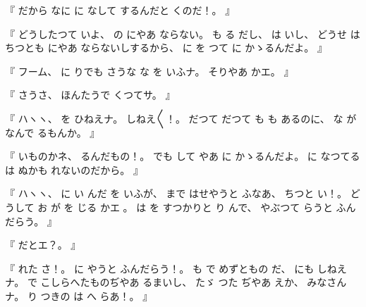 %
『
だから
なに
に
なして
するんだと
くのだ！。
』

%
『
どうしたつて
いよ、
%
の
にやあ
ならない。
%
も
る
だし、
%
は
いし、
%
どうせ
は
ちつとも
にやあ
ならないしするから、
%
に
を
つて
に
かゝるんだよ。
』

%
『
フーム、
%
に
りでも
さうな
な
を
いふナ。
%
そりやあ
かエ。
』

%
『
さうさ、
%
ほんたうで
くつてサ。
』

%
『
ハヽヽ、
%
を
ひねえナ。
%
しねえ〳〵！。
%
だつて
だつて
も
も
あるのに、
%
な
がなんで
るもんか。
』

%
『
いものかネ、
%
るんだもの！。
%
でも
して
やあ
に
かゝるんだよ。
%
に
なつてる
は
ぬかも
れないのだから。
』

%
『
ハヽヽ、
%
に
い
んだ
を
いふが、
%
まで
はせやうと
ふなあ、
%
ちつと
い！。
%
どうして
お
が
を
じる
かエ
。
%
%
は
を
すつかりと
り
んで、
やぶつて
らうと
ふんだらう。
』

%
『
だとエ？。
』

%
『
れた
さ！。
%
に
やうと
ふんだらう！。
%
も
で
めずともの
だ、
%
にも
しねえナ。
%
で
こしらへたものぢやあ
るまいし、
%
たゞ
つた
ぢやあ
えか、
%
みなさんナ。
%
り
つきの
は
へ
らあ！。
』

